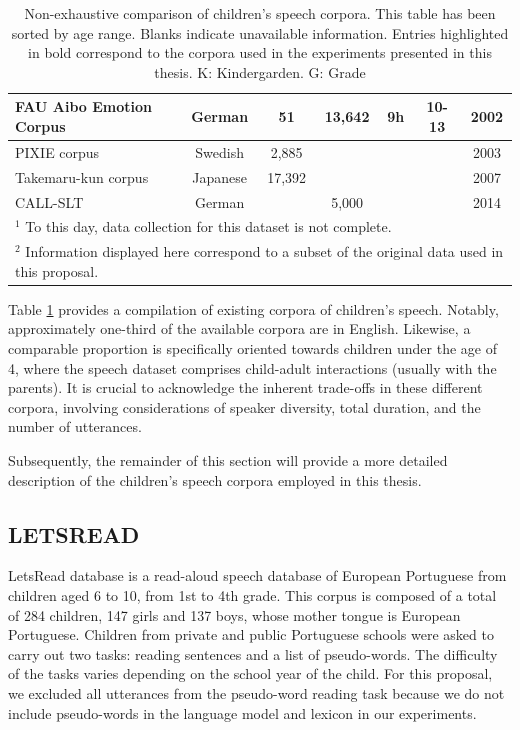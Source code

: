 \begin{table}
\begin{tabular}{l|c|c|c|c|c|c}
\hline
FAU Aibo Emotion Corpus \cite{steidl2009automatic} & German & 51 & 13,642 & 9h & 10-13 & 2002 \\ 
\hline
PIXIE corpus \cite{bell2003child} & Swedish & 2,885 &  &  &  & 2003 \\ 
\hline
Takemaru-kun corpus \cite{takemaru} & Japanese & 17,392 &  &  & & 2007 \\ 
\hline
CALL-SLT \cite{callslt} & German &  & 5,000 &  &  & 2014 \\ 
\hline
\multicolumn{7}{l}{$^1$ To this day, data collection for this dataset is not complete.} \\
\multicolumn{7}{l}{$^2$ Information displayed here correspond to a subset of the original data used in this proposal.}  \\
\end{tabular}
\caption{Non-exhaustive comparison of children's speech corpora. This table has been sorted by age range. Blanks indicate unavailable information. Entries highlighted in bold correspond to the corpora used in the experiments presented in this thesis. K: Kindergarden. G: Grade}
\label{table:children_corpora}
\end{table}

Table \ref{table:children_corpora} provides a compilation of existing corpora of children's speech. Notably, approximately one-third of the available corpora are in English. Likewise, a comparable proportion is specifically oriented towards children under the age of 4, where the speech dataset comprises child-adult interactions (usually with the parents). It is crucial to acknowledge the inherent trade-offs in these different corpora, involving considerations of speaker diversity, total duration, and the number of utterances.

Subsequently, the remainder of this section will provide a more detailed description of the children's speech corpora employed in this thesis.


\subsection{LETSREAD}
LetsRead database \cite{letsread} is a read-aloud speech database of European Portuguese from children aged 6 to 10,  from 1st to 4th grade. This corpus is composed of a total of 284 children, 147 girls and 137 boys, whose mother tongue is European Portuguese. Children from private and public Portuguese schools were asked to carry out two tasks: reading sentences and a list of pseudo-words. The difficulty of the tasks varies depending on the school year of the child. 
For this proposal, we excluded all utterances from the pseudo-word reading task because we do not include pseudo-words in the language model and lexicon in our experiments. 
